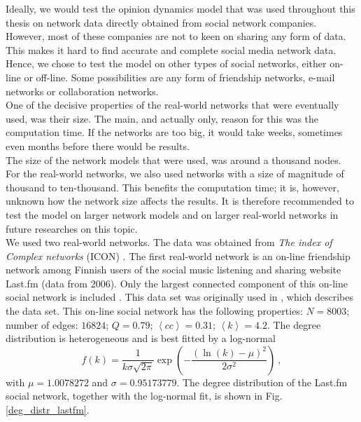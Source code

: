 \documentclass[11 pt , letterpaper , twoside , openright]{book}
\begin{document}
Ideally, we would test the opinion dynamics model that was used throughout this thesis on network data directly obtained from social network companies. However, most of these companies are not to keen on sharing any form of data. This makes it hard to find accurate and complete social media network data. Hence, we chose to test the model on other types of social networks, either on-line or off-line. Some possibilities are any form of friendship networks, e-mail networks or collaboration networks. \\
\newline
One of the decisive properties of the real-world networks that were eventually used, was their size. The main, and actually only, reason for this was the computation time. If the networks are too big, it would take weeks, sometimes even months before there would be results.\\
\newline
The size of the network models that were used, was around a thousand nodes. For the real-world networks, we also used networks with a size of magnitude of thousand to ten-thousand. This benefits the computation time; it is, however, unknown how the network size affects the results. It is therefore recommended to test the model on larger network models and on larger real-world networks in future researches on this topic. \\
\newline
We used two real-world networks. The data was obtained from \textit{The index of Complex networks} (ICON) \cite{ICON}. The first real-world network is an on-line friendship network among Finnish users of the social music listening and sharing website Last.fm (data from $2006$). Only the largest connected component of this on-line social network is included \cite{ICON}. This data set was originally used in \cite{Toivonen2009}, which describes the data set. This on-line social network has the following properties: $N = 8003$; number of edges: $16824$; $Q = 0.79$; $\left<cc\right> = 0.31$; $\left<k\right> = 4.2$. The degree distribution is heterogeneous and is best fitted by a log-normal
\begin{equation}
	f(k) = \frac{1}{k \sigma \sqrt{2\pi}} \exp(-\frac{(\ln(k) - \mu)^2}{2 \sigma^2})\ ,
\end{equation}
with $\mu = 1.0078272$ and $\sigma = 0.95173779$. The degree distribution of the Last.fm social network, together with the log-normal fit, is shown in Fig. \ref{deg_distr_lastfm}.\\
\newline
\end{document}
